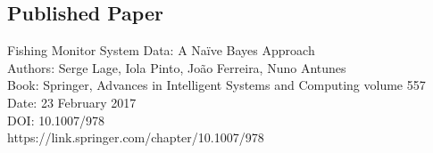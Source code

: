 
\subsection{Published Paper} %
\label{sub:published_paper}
Fishing Monitor System Data: A Naïve Bayes Approach\\
Authors: Serge Lage, Iola Pinto, João Ferreira, Nuno Antunes\\
Book: Springer, Advances in Intelligent Systems and Computing volume 557\\
Date: 23 February 2017\\
DOI: 10.1007/978\\
https://link.springer.com/chapter/10.1007/978






